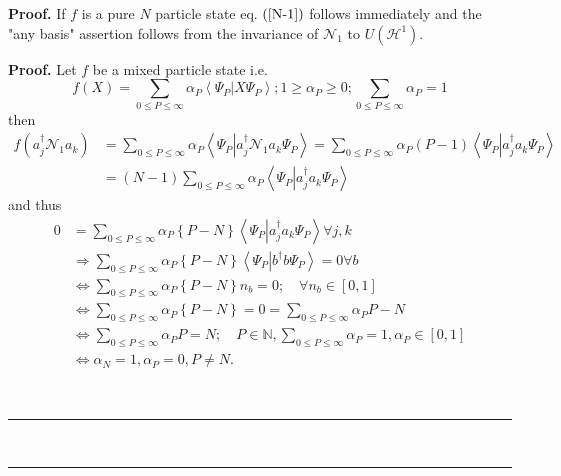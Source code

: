\documentclass[aps,preprint]{revtex4}%
\newenvironment{proof}[1][Proof]{\noindent\textbf{#1.} }{\ \rule{0.5em}{0.5em}}
\begin{document}
\begin{proof}
If $f$ is a pure $N$ particle state eq. $\left(  \ref{N-1}\right)  $ follows
immediately and the "any basis" assertion follows from the invariance of
$\mathcal{N}_{1}$ to $U\left(  \mathcal{H}^{1}\right)  .$

\begin{proof}
Let $f$ be a mixed particle state i.e.
\begin{equation}
f\left(  X\right)  =\sum_{0\leq P\leq\infty}\alpha_{P}\left\langle \Psi
_{P}\left\vert X\Psi_{P}\right.  \right\rangle ;1\geq\alpha_{P}\geq
0;\sum_{0\leq P\leq\infty}\alpha_{P}=1
\end{equation}
then
\begin{align}
f\left(  a_{j}^{\dagger}\mathcal{N}_{1}a_{k}\right)   &  =\sum_{0\leq
P\leq\infty}\alpha_{P}\left\langle \Psi_{P}\left\vert a_{j}^{\dagger
}\mathcal{N}_{1}a_{k}\Psi_{P}\right.  \right\rangle =\sum_{0\leq P\leq\infty
}\alpha_{P}\left(  P-1\right)  \left\langle \Psi_{P}\left\vert a_{j}^{\dagger
}a_{k}\Psi_{P}\right.  \right\rangle \nonumber\\
&  =\left(  N-1\right)  \sum_{0\leq P\leq\infty}\alpha_{P}\left\langle
\Psi_{P}\left\vert a_{j}^{\dagger}a_{k}\Psi_{P}\right.  \right\rangle
\end{align}
and thus%
\begin{align}
0 &  =\sum_{0\leq P\leq\infty}\alpha_{P}\left\{  P-N\right\}  \left\langle
\Psi_{P}\left\vert a_{j}^{\dagger}a_{k}\Psi_{P}\right.  \right\rangle \forall
j,k\nonumber\\
&  \Rightarrow\sum_{0\leq P\leq\infty}\alpha_{P}\left\{  P-N\right\}
\left\langle \Psi_{P}\left\vert b^{\dagger}b\Psi_{P}\right.  \right\rangle
=0\forall b\nonumber\\
&  \Leftrightarrow\sum_{0\leq P\leq\infty}\alpha_{P}\left\{  P-N\right\}
n_{b}=0;\quad\forall n_{b}\in\left[  0,1\right]  \nonumber\\
&  \Leftrightarrow\sum_{0\leq P\leq\infty}\alpha_{P}\left\{  P-N\right\}
=0=\sum_{0\leq P\leq\infty}\alpha_{P}P-N\nonumber\\
&  \Leftrightarrow\sum_{0\leq P\leq\infty}\alpha_{P}P=N;\quad P\in
\mathbb{N},\sum_{0\leq P\leq\infty}\alpha_{P}=1,\alpha_{P}\in\left[
0,1\right]  \nonumber\\
&  \Leftrightarrow\alpha_{N}=1,\alpha_{P}=0,P\neq N.
\end{align}

\end{proof}
\end{proof}
\end{document}

